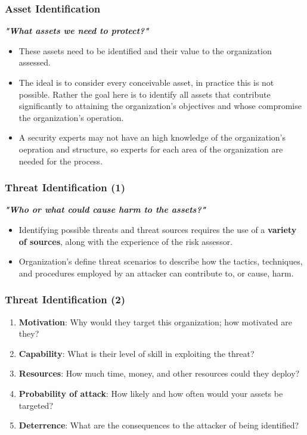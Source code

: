 \documentclass[xcolor ={table,usenames,dvipsnames}]{beamer}
\theoremstyle{definition}
\begin{document}
	\begin{frame}
		\frametitle{Asset Identification}
		\textit{\textbf{"What assets we need to protect?"}}
		\begin{itemize}
			\item These assets need to be identified and their value to the organization assessed.
			\item The ideal is to consider every conceivable asset, in practice this is not possible. Rather the goal here is to identify all assets that contribute significantly to attaining the organization’s objectives and whose compromise the organization’s operation. 
			\item A security experts may not have an high knowledge of the organization's oepration and structure, so experts for each area of the organization are needed for the process.
		\end{itemize}
	\end{frame}

	\begin{frame}
		\frametitle{Threat Identification (1)}
		\textbf{\textit{"Who or what could cause harm to the assets?"}}
		\begin{itemize}
			\item Identifying possible threats and threat sources requires the use of a \textbf{variety of sources}, along with the experience of the risk assessor. 
			\item  Organization’s define threat scenarios to describe how the tactics, techniques, and procedures employed by an attacker can contribute to, or cause, harm. 
		\end{itemize}
		
	\end{frame}

	\begin{frame}
		\frametitle{Threat Identification (2)}
		\begin{enumerate}
			\item  \textbf{Motivation}: Why would they target this organization; how motivated are they?
			\item \textbf{Capability}: What is their level of skill in exploiting the threat?
			\item \textbf{Resources}: How much time, money, and other resources could they deploy?
			\item \textbf{Probability of attack}: How likely and how often would your assets be targeted?
			\item \textbf{Deterrence}: What are the consequences to the attacker of being identified?	
		\end{enumerate}
	\end{frame}
	
\end{document}
